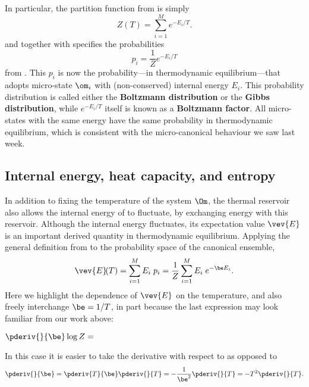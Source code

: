 In particular, the partition function from  is simply
\begin{equation}
  \label{eq:canon_part_func}
  Z(T) = \sum_{i = 1}^M e^{-E_i / T}.
\end{equation}
and together with \be specifies the probabilities
\begin{equation}
  \label{eq:canon_prob}
  p_i = \frac{1}{Z} e^{-E_i / T}
\end{equation}
from .
This $p_i$ is now the probability---in thermodynamic equilibrium---that \Om adopts micro-state $\om_i$ with (non-conserved) internal energy $E_i$.
This probability distribution is called either the \textbf{Boltzmann distribution} or the \textbf{Gibbs distribution}, while $e^{-E_i / T}$ itself is known as a \textbf{Boltzmann factor}.
All micro-states with the same energy have the same probability in thermodynamic equilibrium, which is consistent with the micro-canonical behaviour we saw last week.



\subsection{\label{sec:canon_derived}Internal energy, heat capacity, and entropy}
In addition to fixing the temperature of the system $\Om$, the thermal reservoir also allows the internal energy of \Om to fluctuate, by exchanging energy with this reservoir.
Although the internal energy fluctuates, its expectation value $\vev{E}$ is an important derived quantity in thermodynamic equilibrium.
Applying the general definition from  to the probability space of the canonical ensemble,
\begin{equation*}
  \vev{E}\!(T) = \sum_{i = 1}^M E_i \; p_i = \frac{1}{Z} \sum_{i = 1}^M E_i \; e^{-\be E_i}.
\end{equation*}
\newpage %
\noindent
Here we highlight the dependence of $\vev{E}$ on the temperature, and also freely interchange $\be = 1 / T$, in part because the last expression may look familiar from our work above:
\begin{mdframed}
  $\displaystyle \pderiv{}{\be} \log Z = $ \\[100 pt]
\end{mdframed}
In this case it is easier to take the derivative with respect to \be as opposed to
\begin{equation}
  \label{eq:beta_T}
  \pderiv{}{\be} = \pderiv{T}{\be} \pderiv{}{T} = -\frac{1}{\be^2} \pderiv{}{T} = -T^2 \pderiv{}{T}.
\end{equation}

